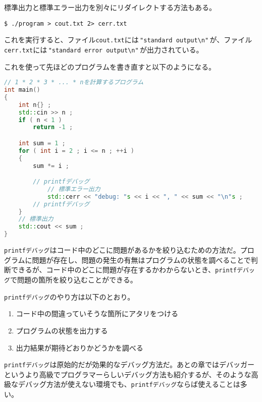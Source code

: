 標準出力と標準エラー出力を別々にリダイレクトする方法もある。

\begin{lstlisting}[style=terminal]
$ ./program > cout.txt 2> cerr.txt
\end{lstlisting}

これを実行すると、ファイル\texttt{cout.txt}には\,\texttt{"standard output{\textbackslash}n"}\,が、ファイル\texttt{cerr.txt}には\,\texttt{"standard error output{\textbackslash}n"}\,が出力されている。

これを使って先ほどのプログラムを書き直すと以下のようになる。

\begin{lstlisting}[language={C++}]
// 1 * 2 * 3 * ... * nを計算するプログラム
int main()
{
    int n{} ;
    std::cin >> n ;
    if ( n < 1 )
        return -1 ;

    int sum = 1 ;  
    for ( int i = 2 ; i <= n ; ++i )
    {
        sum *= i ;

        // printfデバッグ
            // 標準エラー出力
            std::cerr << "debug: "s << i << ", " << sum << "\n"s ;
        // printfデバッグ
    }
    // 標準出力
    std::cout << sum ;
}
\end{lstlisting}

\clearpage
{}

\texttt{printfデバッグ}はコード中のどこに問題があるかを絞り込むための方法だ。プログラムに問題が存在し、問題の発生の有無はプログラムの状態を調べることで判断できるが、コード中のどこに問題が存在するかわからないとき、\texttt{printfデバッグ}で問題の箇所を絞り込むことができる。

\texttt{printfデバッグ}のやり方は以下のとおり。

\begin{enumerate}
\def\labelenumi{\arabic{enumi}.}
\item
  コード中の間違っていそうな箇所にアタリをつける
\item
  プログラムの状態を出力する
\item
  出力結果が期待どおりかどうかを調べる
\end{enumerate}

\texttt{printfデバッグ}は原始的だが効果的なデバッグ方法だ。あとの章ではデバッガーというより高級でプログラマーらしいデバッグ方法も紹介するが、そのような高級なデバッグ方法が使えない環境でも、\texttt{printfデバッグ}ならば使えることは多い。
